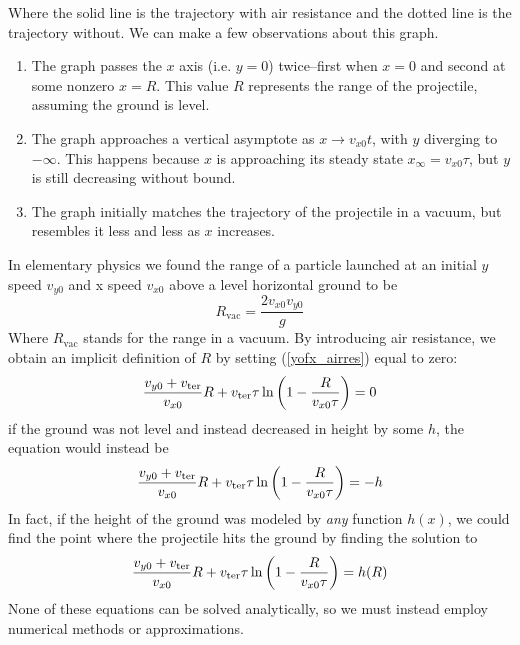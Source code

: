 Where the solid line is the trajectory with air resistance and the dotted line is the trajectory without. We can make a few observations about this graph.
\begin{enumerate}
    \item The graph passes the $x$ axis (i.e. $y=0$) twice--first when $x=0$ and second at some nonzero $x=R$. This value $R$ represents the range of the projectile, assuming the ground is level. 
    \item The graph approaches a vertical asymptote as $x\to v_{x0}t$, with $y$ diverging to $-\infty$. This happens because $x$ is approaching its steady state $x_\infty = v_{x0}\tau$, but $y$ is still decreasing without bound.
    \item The graph initially matches the trajectory of the projectile in a vacuum, but resembles it less and less as $x$ increases.
\end{enumerate}
In elementary physics we found the range of a particle launched at an initial $y$ speed $v_{y0}$ and x speed $v_{x0}$ above a level horizontal ground to be
\[ R_{\text{vac}} = \frac{2v_{x0}v_{y0}}{g}\]
Where $R_{\text{vac}}$ stands for the range in a vacuum. By introducing air resistance, we obtain an implicit definition of $R$ by setting (\ref{yofx_airres}) equal to zero:
\begin{equation} \label{rangelevelres}
    \frac{v_{y0} + v_{\text{ter}}}{v_{x0}}R + v_{\text{ter}}\tau\ln\pqty{1 - \frac{R}{v_{x0}\tau}} = 0
\end{equation}
if the ground was not level and instead decreased in height by some $h$, the equation would instead be
\[ \frac{v_{y0} + v_{\text{ter}}}{v_{x0}}R + v_{\text{ter}}\tau\ln\pqty{1 - \frac{R}{v_{x0}\tau}} = -h\]
In fact, if the height of the ground was modeled by \textit{any} function $h(x)$, we could find the point where the projectile hits the ground by finding the solution to
\[ \frac{v_{y0} + v_{\text{ter}}}{v_{x0}}R + v_{\text{ter}}\tau\ln\pqty{1 - \frac{R}{v_{x0}\tau}} = h(R) \]
None of these equations can be solved analytically, so we must instead employ numerical methods or approximations. 
